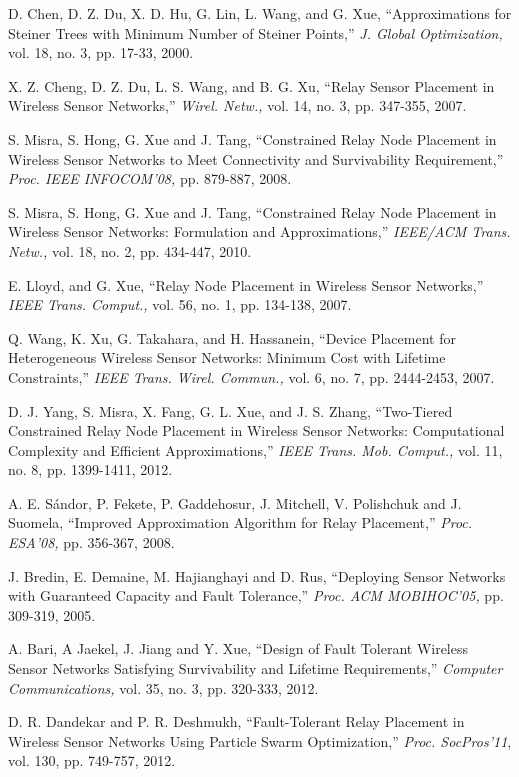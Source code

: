 \documentclass[journal]{IEEEtran}
\begin{document}
\begin{thebibliography}{1}
D. Chen, D. Z. Du, X. D. Hu, G. Lin, L. Wang, and G. Xue, ``Approximations for Steiner Trees with Minimum Number
of Steiner Points,'' {\it J. Global Optimization,} vol. 18, no. 3, pp. 17-33, 2000.

 X. Z. Cheng, D. Z. Du, L. S. Wang, and B. G. Xu, ``Relay Sensor Placement in Wireless Sensor Networks,''
 {\it Wirel. Netw.,} vol. 14, no. 3, pp. 347-355, 2007.

S. Misra, S. Hong, G. Xue and J. Tang, ``Constrained Relay Node Placement in Wireless Sensor Networks to
Meet Connectivity and Survivability Requirement,'' {\it Proc. IEEE INFOCOM'08,} pp. 879-887, 2008.

S. Misra, S. Hong, G. Xue and J. Tang, ``Constrained Relay Node Placement in Wireless Sensor Networks:
Formulation and Approximations,'' {\it IEEE/ACM Trans. Netw.,} vol. 18, no. 2, pp. 434-447, 2010.

 E. Lloyd, and G. Xue, ``Relay Node Placement in Wireless Sensor Networks,'' {\it IEEE Trans. Comput.,} vol. 56,
 no. 1, pp. 134-138, 2007.

Q. Wang, K. Xu, G. Takahara, and H. Hassanein, ``Device Placement for Heterogeneous Wireless Sensor Networks:
Minimum Cost with Lifetime Constraints,'' {\it IEEE Trans. Wirel. Commun.,} vol. 6, no. 7, pp. 2444-2453, 2007.

 D. J. Yang, S. Misra, X. Fang, G. L. Xue, and J. S. Zhang, ``Two-Tiered Constrained Relay Node Placement in Wireless
 Sensor Networks: Computational Complexity and Efficient Approximations,'' {\it IEEE Trans. Mob. Comput.,}
 vol. 11, no. 8, pp. 1399-1411, 2012.

 A. E. S\'{a}ndor, P. Fekete, P. Gaddehosur, J. Mitchell, V. Polishchuk and J. Suomela, ``Improved Approximation Algorithm for Relay
 Placement,'' {\it Proc. ESA'08,} pp. 356-367, 2008.

 J. Bredin, E. Demaine, M. Hajianghayi and D. Rus, ``Deploying Sensor Networks with Guaranteed Capacity and Fault Tolerance,''
 {\it Proc. ACM MOBIHOC'05,} pp. 309-319, 2005.

 A. Bari, A Jaekel, J. Jiang and Y. Xue, ``Design of Fault Tolerant Wireless Sensor Networks Satisfying Survivability and Lifetime
 Requirements,'' {\it Computer Communications,} vol. 35, no. 3, pp. 320-333, 2012.

 D. R. Dandekar and P. R. Deshmukh, ``Fault-Tolerant Relay Placement in Wireless Sensor Networks Using Particle Swarm Optimization,''
 {\it Proc. SocPros'11}, vol. 130, pp. 749-757, 2012.

\end{thebibliography}
\end{document}
